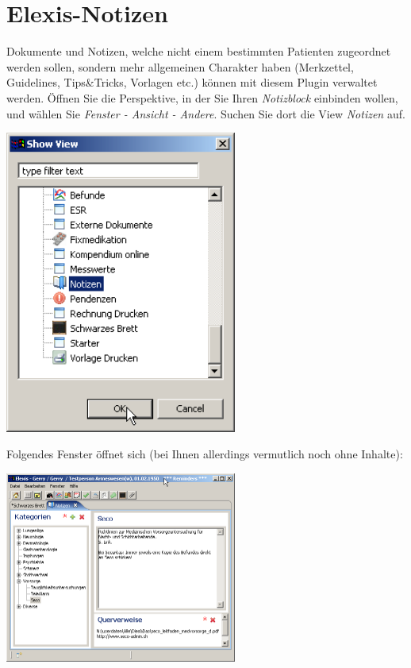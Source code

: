 
\section{Elexis-Notizen}
Dokumente und Notizen, welche nicht einem bestimmten Patienten zugeordnet werden sollen,
sondern mehr allgemeinen Charakter haben (Merkzettel, Guidelines, Tips\&Tricks, Vorlagen etc.)
können mit diesem Plugin verwaltet werden. Öffnen Sie die Perspektive, in der Sie Ihren \textit{Notizblock}
einbinden wollen, und wählen Sie \textit{Fenster - Ansicht - Andere}. Suchen Sie dort die View \textit{Notizen}
auf.

\includegraphics[width=3in]{images/notizen1}

Folgendes Fenster öffnet sich (bei Ihnen allerdings vermutlich noch ohne Inhalte):

\includegraphics[width=3in]{images/notizen2}

